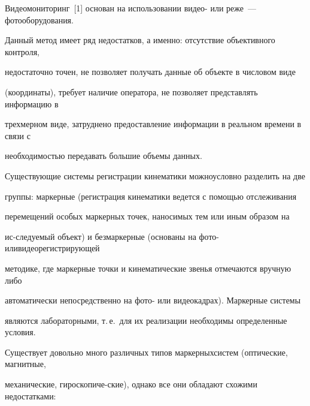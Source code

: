 Видеомониторинг~[1] основан на использовании видео- или реже~--- фотооборудования. 


Данный метод имеет ряд недостатков, а именно: отсутствие объективного контроля, 


недостаточно точен, не позволяет получать данные об объекте в числовом виде 


(координаты), требует наличие оператора, не позволяет представлять информацию в 


трехмерном виде, затруднено предо\-став\-ле\-ние информации в реальном времени в связи с 


не\-об\-хо\-ди\-мостью передавать большие объемы данных.





Существующие системы регистрации кинематики можно\linebreak условно разделить на две 


группы: маркерные (регистрация кинематики ведется с помощью отслеживания 


перемещений особых маркерных точек, наносимых тем или иным образом на 


ис-\linebreak следуемый объект) и безмаркерные (основаны на фото- или\linebreak видеорегистрирующей 


методике, где маркерные точки и кинематические \mbox{звенья} отмечаются вручную либо 


автоматически  непосредственно на фото- или видеокадрах). Маркерные системы 


являются лабораторными, т.\,е.\ для их реализации необходимы определенные условия.





Существует довольно много различных типов маркерных\linebreak систем (оптические, магнитные, 


механические, гироскопиче-\linebreak ские), однако все они обладают схожими недостатками: 


